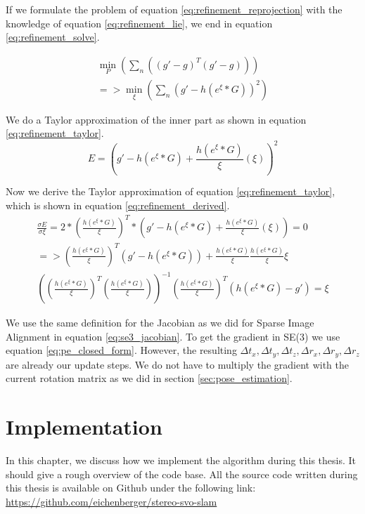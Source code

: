 \documentclass[11pt,a4paper,titlepage,oneside]{report}
\begin{document}
If we formulate the problem of equation \ref{eq:refinement_reprojection} with the knowledge of equation \ref{eq:refinement_lie}, we end in equation \ref{eq:refinement_solve}.

\begin{equation}\label{eq:refinement_solve}
  \begin{gathered}
    \min_P(\sum_n ((g'-g)^T(g'-g)))\\
    =>\min_{\xi}(\sum_n (g'-h(e^{\xi}*G))^2)
  \end{gathered}
\end{equation}

We do a Taylor approximation of the inner part as shown in equation \ref{eq:refinement_taylor}.
\begin{equation}\label{eq:refinement_taylor}
  E=(g'-h(e^{\xi}*G)+\frac{h(e^{\xi}*G)}{\xi}(\xi))^2
\end{equation}

Now we derive the Taylor approximation of equation \ref{eq:refinement_taylor}, which is shown in equation \ref{eq:refinement_derived}.
\begin{equation}\label{eq:refinement_derived}
  \begin{gathered}
    \frac{\sigma E}{\sigma \xi}=2*(\frac{h(e^{\xi}*G)}{\xi})^T*(g'-h(e^{\xi}*G)+\frac{h(e^{\xi}*G)}{\xi}(\xi))=0\\
    =>(\frac{h(e^{\xi}*G)}{\xi})^T(g'-h(e^{\xi}*G))+\frac{h(e^{\xi}*G)}{\xi}\frac{h(e^{\xi}*G)}{\xi}\xi\\
    ((\frac{h(e^{\xi}*G)}{\xi})^T(\frac{h(e^{\xi}*G)}{\xi}))^{-1}(\frac{h(e^{\xi}*G)}{\xi})^T(h(e^{\xi}*G)-g')=\xi
  \end{gathered}
\end{equation}

We use the same definition for the Jacobian as we did for Sparse Image Alignment in equation \ref{eq:se3_jacobian}. To get the gradient in SE(3) we use equation \ref{eq:pe_closed_form}. However, the resulting $\Delta t_x,\Delta t_y,\Delta t_z,\Delta r_x,\Delta r_y,\Delta r_z$ are already our update steps. We do not have to multiply the gradient with the current rotation matrix as we did in section \ref{sec:pose_estimation}.

\chapter{Implementation}\label{ch:implementation}
In this chapter, we discuss how we implement the algorithm during this thesis. It should give a rough overview of the code base. All the source code written during this thesis is available on Github under the following link:\\
\url{https://github.com/eichenberger/stereo-svo-slam}
\end{document}
